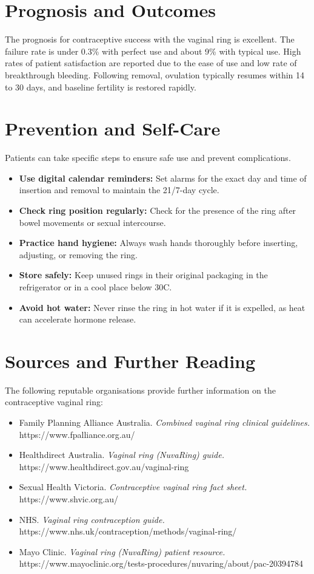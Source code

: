 \section*{Prognosis and Outcomes}
The prognosis for contraceptive success with the vaginal ring is excellent. The failure rate is under 0.3\% with perfect use and about 9\% with typical use. High rates of patient satisfaction are reported due to the ease of use and low rate of breakthrough bleeding. Following removal, ovulation typically resumes within 14 to 30 days, and baseline fertility is restored rapidly.

\section*{Prevention and Self-Care}
Patients can take specific steps to ensure safe use and prevent complications.
\begin{itemize}
    \item \textbf{Use digital calendar reminders:} Set alarms for the exact day and time of insertion and removal to maintain the 21/7-day cycle.
    \item \textbf{Check ring position regularly:} Check for the presence of the ring after bowel movements or sexual intercourse.
    \item \textbf{Practice hand hygiene:} Always wash hands thoroughly before inserting, adjusting, or removing the ring.
    \item \textbf{Store safely:} Keep unused rings in their original packaging in the refrigerator or in a cool place below 30\textdegree C.
    \item \textbf{Avoid hot water:} Never rinse the ring in hot water if it is expelled, as heat can accelerate hormone release.
\end{itemize}

\section*{Sources and Further Reading}
The following reputable organisations provide further information on the contraceptive vaginal ring:
\begin{itemize}
    \item Family Planning Alliance Australia. \textit{Combined vaginal ring clinical guidelines.} https://www.fpalliance.org.au/
    \item Healthdirect Australia. \textit{Vaginal ring (NuvaRing) guide.} https://www.healthdirect.gov.au/vaginal-ring
    \item Sexual Health Victoria. \textit{Contraceptive vaginal ring fact sheet.} https://www.shvic.org.au/
    \item NHS. \textit{Vaginal ring contraception guide.} https://www.nhs.uk/contraception/methods/vaginal-ring/
    \item Mayo Clinic. \textit{Vaginal ring (NuvaRing) patient resource.} https://www.mayoclinic.org/tests-procedures/nuvaring/about/pac-20394784
\end{itemize}
